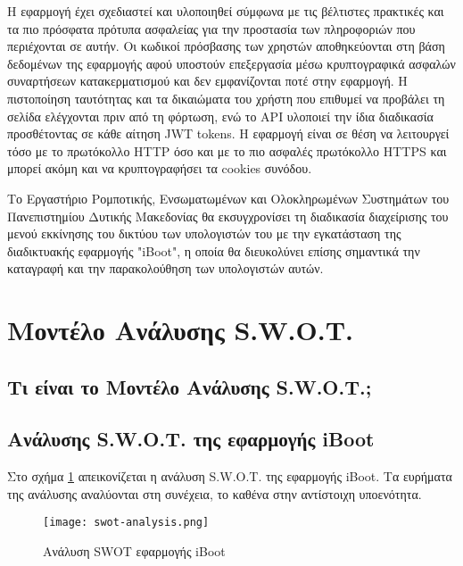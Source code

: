 Η εφαρμογή έχει σχεδιαστεί και υλοποιηθεί σύμφωνα με τις βέλτιστες πρακτικές και τα πιο πρόσφατα πρότυπα ασφαλείας για την προστασία των πληροφοριών που περιέχονται σε αυτήν. Οι κωδικοί πρόσβασης των χρηστών αποθηκεύονται στη βάση δεδομένων της εφαρμογής αφού υποστούν επεξεργασία μέσω κρυπτογραφικά ασφαλών συναρτήσεων κατακερματισμού και δεν εμφανίζονται ποτέ στην εφαρμογή. Η πιστοποίηση ταυτότητας και τα δικαιώματα του χρήστη που επιθυμεί να προβάλει τη σελίδα ελέγχονται πριν από τη φόρτωση, ενώ το API υλοποιεί την ίδια διαδικασία προσθέτοντας σε κάθε αίτηση JWT tokens. Η εφαρμογή είναι σε θέση να λειτουργεί τόσο με το πρωτόκολλο HTTP όσο και με το πιο ασφαλές πρωτόκολλο HTTPS και μπορεί ακόμη και να κρυπτογραφήσει τα cookies συνόδου.

Το Εργαστήριο Ρομποτικής, Ενσωματωμένων και Ολοκληρωμένων Συστημάτων του Πανεπιστημίου Δυτικής Μακεδονίας θα εκσυγχρονίσει τη διαδικασία διαχείρισης του μενού εκκίνησης του δικτύου των υπολογιστών του με την εγκατάσταση της διαδικτυακής εφαρμογής "iBoot", η οποία θα διευκολύνει επίσης σημαντικά την καταγραφή και την παρακολούθηση των υπολογιστών αυτών.

\section{Μοντέλο Ανάλυσης S.W.O.T.}

\subsection{Τι είναι το Μοντέλο Ανάλυσης S.W.O.T.;}


\subsection{Ανάλυσης S.W.O.T. της εφαρμογής iBoot}
Στο σχήμα \ref{fig:iBoot_swot_analysis} απεικονίζεται η ανάλυση S.W.O.T. της εφαρμογής iBoot. Τα ευρήματα της ανάλυσης αναλύονται στη συνέχεια, το καθένα στην αντίστοιχη υποενότητα.

\begin{figure}[ht]
	\centering
	\texttt{[image: swot-analysis.png]}
	\caption{Ανάλυση SWOT εφαρμογής iBoot}
	\label{fig:iBoot_swot_analysis}
\end{figure}

